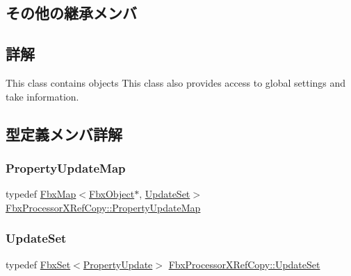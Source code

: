 \subsection*{その他の継承メンバ}


\subsection{詳解}
This class contains objects This class also provides access to global settings and take information. 

\subsection{型定義メンバ詳解}
\mbox{\label{class_fbx_processor_x_ref_copy_af0408f51b60aa6c9fb8aab6e73f57eb7}} 
\subsubsection{\texorpdfstring{Property\+Update\+Map}{PropertyUpdateMap}}
{\footnotesize\ttfamily typedef \hyperlink{class_fbx_map}{Fbx\+Map}$<$\hyperlink{class_fbx_object}{Fbx\+Object}$\ast$, \hyperlink{class_fbx_processor_x_ref_copy_aa745209208dc5e21926fa7d4dde84afb}{Update\+Set}$>$ \hyperlink{class_fbx_processor_x_ref_copy_af0408f51b60aa6c9fb8aab6e73f57eb7}{Fbx\+Processor\+X\+Ref\+Copy\+::\+Property\+Update\+Map}}

\mbox{\label{class_fbx_processor_x_ref_copy_aa745209208dc5e21926fa7d4dde84afb}} 
\subsubsection{\texorpdfstring{Update\+Set}{UpdateSet}}
{\footnotesize\ttfamily typedef \hyperlink{class_fbx_set}{Fbx\+Set}$<$\hyperlink{struct_fbx_processor_x_ref_copy_1_1_property_update}{Property\+Update}$>$ \hyperlink{class_fbx_processor_x_ref_copy_aa745209208dc5e21926fa7d4dde84afb}{Fbx\+Processor\+X\+Ref\+Copy\+::\+Update\+Set}}



